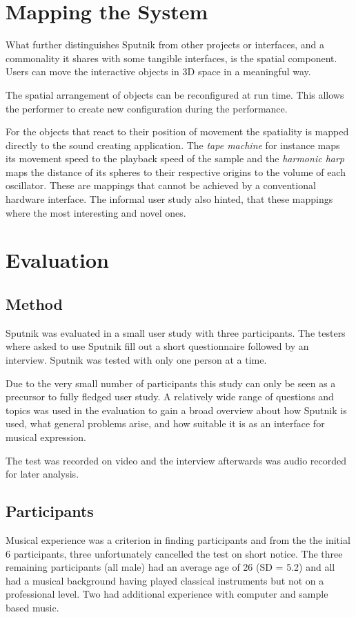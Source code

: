 \documentclass[10pt,a4paper]{scrartcl}
\begin{document}
\section{Mapping the System}
What further distinguishes Sputnik from other projects or interfaces, and a commonality it shares with some tangible interfaces, is the spatial component. Users can move the interactive objects in 3D space in a meaningful way.

The spatial arrangement of objects can be reconfigured at run time. This allows the performer to create new configuration during the performance. 

For the objects that react to their position of movement the spatiality is mapped directly to the sound creating application. The \emph{tape machine} for instance maps its movement speed to the playback speed of the sample and the \emph{harmonic harp} maps the distance of its spheres to their respective origins to the volume of each oscillator. These are mappings that cannot be achieved by a conventional hardware interface. The informal user study also hinted, that these mappings where the most interesting and novel ones.



\section{Evaluation}
\label{sec:evaluation}

\subsection{Method}
Sputnik was evaluated in a small user study with three participants. The testers where asked to use Sputnik fill out a short questionnaire followed by an interview. Sputnik was tested with only one person at a time.

Due to the very small number of participants this study can only be seen as a precursor to fully fledged user study. A relatively wide range of questions and topics was used in the evaluation to gain a broad overview about how Sputnik is used, what general problems arise, and how suitable it is as an interface for musical expression.

The test was recorded on video and the interview afterwards was audio recorded for later analysis.

\subsection{Participants}
Musical experience was a criterion in finding participants and from the the initial 6 participants, three unfortunately cancelled the test on short notice. The three remaining participants (all male) had an average age of 26 (SD = 5.2) and all had a musical background having played classical instruments but not on a professional level. Two had additional experience with computer and sample based music.
\end{document}
